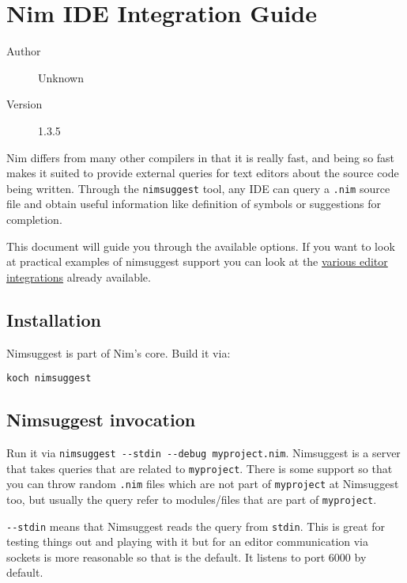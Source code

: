 \hypertarget{nim-ide-integration-guide}{%
\section{Nim IDE Integration Guide}\label{nim-ide-integration-guide}}

\begin{description}
\item[Author]
Unknown
\item[Version]
1.3.5
\end{description}

Nim differs from many other compilers in that it is really fast, and
being so fast makes it suited to provide external queries for text
editors about the source code being written. Through the
\texttt{nimsuggest} tool, any IDE can query a \texttt{.nim} source file
and obtain useful information like definition of symbols or suggestions
for completion.

This document will guide you through the available options. If you want
to look at practical examples of nimsuggest support you can look at the
\href{https://github.com/Araq/Nim/wiki/Editor-Support}{various editor
integrations} already available.

\hypertarget{installation}{%
\subsection{Installation}\label{installation}}

Nimsuggest is part of Nim's core. Build it via:

\begin{verbatim}
koch nimsuggest
\end{verbatim}

\hypertarget{nimsuggest-invocation}{%
\subsection{Nimsuggest invocation}\label{nimsuggest-invocation}}

Run it via \texttt{nimsuggest\ -\/-stdin\ -\/-debug\ myproject.nim}.
Nimsuggest is a server that takes queries that are related to
\texttt{myproject}. There is some support so that you can throw random
\texttt{.nim} files which are not part of \texttt{myproject} at
Nimsuggest too, but usually the query refer to modules/files that are
part of \texttt{myproject}.

\texttt{-\/-stdin} means that Nimsuggest reads the query from
\texttt{stdin}. This is great for testing things out and playing with it
but for an editor communication via sockets is more reasonable so that
is the default. It listens to port 6000 by default.

